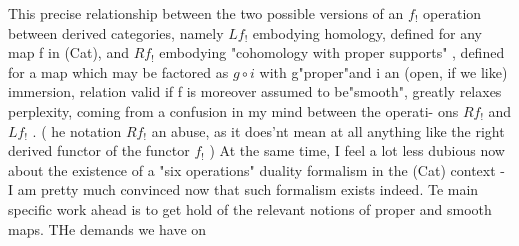 This precise relationship between the two possible versions of
an $f_{!}$ operation  between derived categories, namely $Lf_{!}$
embodying homology, defined for any map f in (Cat), and $Rf_{!}$ embodying
"cohomology with proper supports" , defined for a map which may be
factored as $g\circ i$ with g\hand{/}"proper"and i an (open, if we like) immersion,
relation valid if f is moreover assumed to be"smooth", greatly relaxes
  perplexity, coming from a  confusion in my mind between the operati-%
ons $Rf_{!}$ and $Lf_{!}$ . (  he notation $Rf_{!}$   an abuse, as
  it does'nt mean at all anything like the  right derived functor
of the functor $f_{!}$ \hand{!}) At the same time, I feel a lot less dubious now
about the existence of a  "six operations" duality formalism in
the (Cat) context - I am pretty much convinced now that such formalism
exists indeed. Te main specific work ahead is to get hold of the
relevant notions of proper and smooth maps. THe demands we have on


